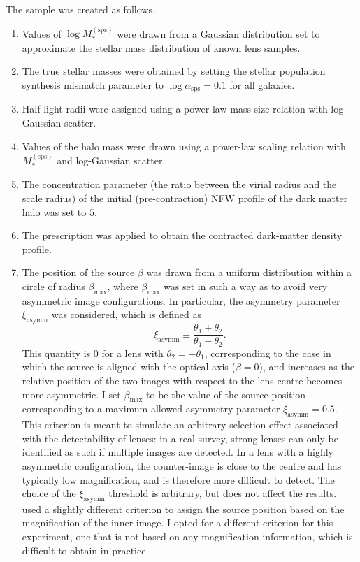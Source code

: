 \documentclass{aa}
\def\msps{M_*^{\mathrm{(sps)}}}
\def\asymm{\xi_{\mathrm{asymm}}}
\def\asps{\alpha_{\mathrm{sps}}}
\def\betamax{\beta_{\mathrm{max}}}
\begin{document}
The sample was created as follows. 
\begin{enumerate}
\item Values of $\log{\msps}$ were drawn from a Gaussian distribution set to approximate the stellar mass distribution of known lens samples.
\item The true stellar masses were obtained by setting the stellar population synthesis mismatch parameter to $\log{\asps}=0.1$ for all galaxies.
\item Half-light radii were assigned using a power-law mass-size relation with log-Gaussian scatter.
\item Values of the halo mass were drawn using a power-law scaling relation with $\msps$ and log-Gaussian scatter.
\item The concentration parameter (the ratio between the virial radius and the scale radius) of the initial (pre-contraction) NFW profile of the dark matter halo was set to $5$.
\item The \citet{Cautun2020} prescription was applied to obtain the contracted dark-matter density profile.
\item The position of the source $\beta$ was drawn from a uniform distribution within a circle of radius $\betamax$, where $\betamax$ was set in such a way as to avoid very asymmetric image configurations. In particular,  the asymmetry parameter $\asymm$ was considered, which is defined as
\begin{equation}
\asymm \equiv \frac{\theta_1 + \theta_2}{\theta_1 - \theta_2}.
\end{equation}
This quantity is $0$ for a lens with $\theta_2 = -\theta_1$, corresponding to the case in which the source is aligned with the optical axis ($\beta=0$), and increases as the relative position of the two images with respect to the lens centre becomes more asymmetric. I set $\betamax$ to be the value of the source position corresponding to a maximum allowed asymmetry parameter $\asymm=0.5$. This criterion is meant to simulate an arbitrary selection effect associated with the detectability of lenses: in a real survey, strong lenses can only be identified as such if multiple images are detected. In a lens with a highly asymmetric configuration, the counter-image is close to the centre and has typically low magnification, and is  therefore more difficult to detect. The choice of the $\asymm$ threshold is arbitrary, but does not affect the results.
 used a slightly different criterion to assign the source position based on the magnification of the inner image. I opted for a different criterion for this experiment, one that is not based on any magnification information, which is difficult to obtain in practice.
\end{enumerate}
\end{document}
